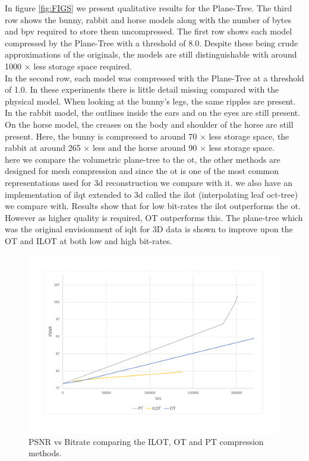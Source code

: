 In figure \ref{fig:FIGS} we present qualitative results for the Plane-Tree. The third row shows the bunny, rabbit and horse models along with the number of bytes and bpv required to store them uncompressed. The first row shows each model compressed by the Plane-Tree with a threshold of 8.0. Despite these being crude approximations of the originals, the models are still distinguishable with around 1000 $\times$ less storage space required. \\

In the second row, each model was compressed with the Plane-Tree at a threshold of 1.0. In these experiments there is little detail missing compared with the physical model. When looking at the bunny's legs, the same ripples are present. In the rabbit model, the outlines inside the ears and on the eyes are still present. On the horse model, the creases on the body and shoulder of the horse are still present. Here, the bunny is compressed to around 70 $\times$ less storage space, the rabbit at around 265 $\times$ less and the horse around 90 $\times$ less storage space. \\




here we compare the volumetric plane-tree to the ot, the other methods are designed for mesh compression and since the ot is one of the most common representations used for 3d reconstruction we compare with it. we also have an implementation of ilqt extended to 3d called the ilot (interpolating leaf oct-tree) we compare with. Results show that for low bit-rates the ilot outperforms the ot. However as higher quality is required, OT outperforms this. The plane-tree which was the original envisionment of iqlt for 3D data is shown to improve upon the OT and ILOT at both low and high bit-rates. \\

\begin{figure}[t]
\centering
\includegraphics[width=6.0in]{images/results/compression/psnr1}
\caption{PSNR vs Bitrate comparing the ILOT, OT and PT compression methods.}
\label{fig:PSNR1}
\end{figure}

